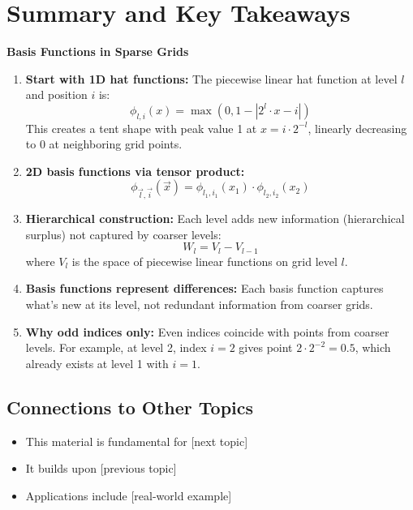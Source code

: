 \documentclass[11pt,a4paper]{article}
\begin{document}
\section{Summary and Key Takeaways}

\begin{keypoint}
    \textbf{Basis Functions in Sparse Grids}
    \begin{enumerate}
        \item \textbf{Start with 1D hat functions:} The piecewise linear hat function at level $l$ and position $i$ is:
        $$\phi_{l,i}(x) = \max(0, 1 - |2^l \cdot x - i|)$$
        This creates a tent shape with peak value 1 at $x = i \cdot 2^{-l}$, linearly decreasing to 0 at neighboring grid points.
        
        \item \textbf{2D basis functions via tensor product:} 
        $$\phi_{\vec{l},\vec{i}}(\vec{x}) = \phi_{l_1,i_1}(x_1) \cdot \phi_{l_2,i_2}(x_2)$$
        
        \item \textbf{Hierarchical construction:} Each level adds new information (hierarchical surplus) not captured by coarser levels:
        $$W_l = V_l - V_{l-1}$$
        where $V_l$ is the space of piecewise linear functions on grid level $l$.
        
        \item \textbf{Basis functions represent differences:} Each basis function captures what's new at its level, not redundant information from coarser grids.
        
        \item \textbf{Why odd indices only:} Even indices coincide with points from coarser levels. For example, at level 2, index $i=2$ gives point $2 \cdot 2^{-2} = 0.5$, which already exists at level 1 with $i=1$.
    \end{enumerate}
\end{keypoint}

\subsection{Connections to Other Topics}
\begin{itemize}
    \item This material is fundamental for [next topic]
    \item It builds upon [previous topic]
    \item Applications include [real-world example]
\end{itemize}
\end{document}
